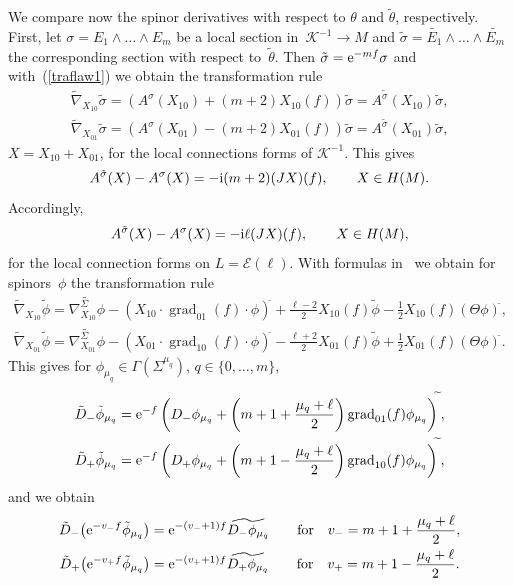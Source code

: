 \documentclass[pdftex]{sigma}
\numberwithin{equation}{section}
\begin{document}
We compare now the spinor derivatives with respect to $\theta$ and $\tilde{\theta}$, respectively.
First, let
$\sigma= E_1\wedge\dots\wedge E_m$ be a local section in~$\mathcal{K}^{-1}\to M$
and $\tilde{\sigma}= \widetilde{E_1}\wedge\dots\wedge \widetilde{E_m}$ the corresponding section with respect to~$\tilde{\theta}$.
Then $\tilde{\sigma}={\rm e}^{-mf}\sigma$ and with~(\ref{traflaw1}) we obtain the transformation rule
\begin{gather*}
\widetilde{\nabla}_{X_{10}}\tilde{\sigma} = \left(A^\sigma(X_{10}) + (m+2)X_{10}(f) \right) \tilde{\sigma} = A^{\tilde{\sigma}}(X_{10})\tilde{\sigma},\\
\widetilde{\nabla}_{X_{01}}\tilde{\sigma} = \left( A^\sigma(X_{01}) - (m+2)X_{01}(f) \right) \tilde{\sigma} = A^{\tilde{\sigma}}(X_{01})\tilde{\sigma},
\end{gather*}
$X=X_{10}+X_{01}$, for the local connections forms of $\mathcal{K}^{-1}$. This gives
\[ A^{\tilde{\sigma}}(X)- A^{\sigma}(X)=-{\rm i}(m+2) (JX)(f), \qquad X\in H(M).\]
Accordingly,
\[
A^{\tilde{\sigma}}(X)- A^{\sigma}(X) = -{\rm i}\ell (JX)(f),\qquad X\in H(M),
\]
 for the local connection forms on $L=\mathcal{E}(\ell)$.
With formulas in~\cite{LeiN1} we obtain for spinors~$\phi$ the transformation rule
\begin{gather*}
\widetilde{\nabla}_{X_{10}}\tilde{\phi} = \widetilde{\nabla_{X_{10}}^{\Sigma}\phi}-(X_{10}\cdot \operatorname{grad}_{01}(f)\cdot \phi)^{\widetilde{}}
+\frac{\ell-2}{2}X_{10}(f)\tilde{\phi}
-\frac{1}{2}X_{10}(f)(\Theta\phi)^{\widetilde{}},
\\
\widetilde{\nabla}_{X_{01}}\tilde{\phi} = \widetilde{\nabla_{X_{01}}^{\Sigma}\phi}-(X_{01}\cdot \operatorname{grad}_{10}(f)\cdot \phi)^{\widetilde{}}
-\frac{\ell+2}{2}X_{01}(f)\tilde{\phi}
+\frac{1}{2}X_{01}(f)(\Theta\phi)^{\widetilde{}}.
\end{gather*}
This gives for $\phi_{\mu_q}\in\Gamma(\Sigma^{\mu_q})$, $q\in\{0,\dots,m\}$,
\begin{gather*}
\tilde{D}_-\tilde{\phi}_{\mu_q} = {\rm e}^{-f}\left( D_-\phi_{\mu_q}
+ \left(m+1+\frac{\mu_q+\ell}{2}\right) \operatorname{grad}_{01}(f) \phi_{\mu_q} \right)^{\widetilde{}},
\\
\tilde{D}_+\tilde{\phi}_{\mu_q} = {\rm e}^{-f}\left( D_+\phi_{\mu_q}
+ \left(m+1-\frac{\mu_q+\ell}{2}\right) \operatorname{grad}_{10}(f) \phi_{\mu_q} \right)^{\widetilde{}},
\end{gather*}
and we obtain
\begin{gather*}
\tilde{D}_- \big({\rm e}^{-v_- f}\tilde{\phi}_{\mu_q}\big) = {\rm e}^{-(v_-+1)f} \widetilde{D_-\phi_{\mu_q}}\qquad
\mbox{for}\quad v_-=m+1+\frac{\mu_{q}+\ell}{2},\\
\tilde{D}_+ \big({\rm e}^{-v_+ f}\tilde{\phi}_{\mu_q}\big) = {\rm e}^{-(v_++1)f} \widetilde{D_+\phi_{\mu_q}}\qquad
\mbox{for}\quad v_+=m+1-\frac{\mu_{q}+\ell}{2}.
\end{gather*}
\end{document}

